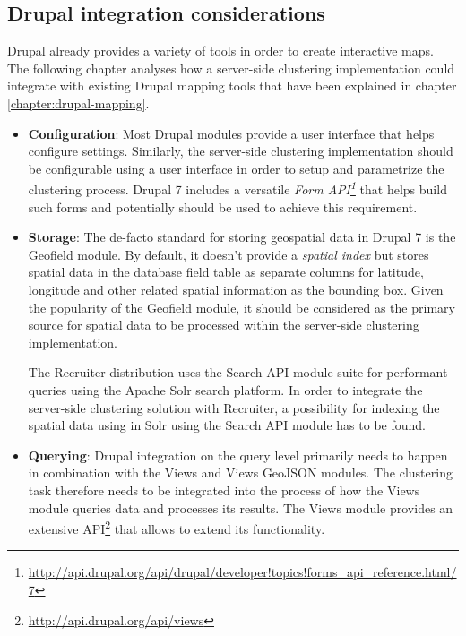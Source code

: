 \subsection{Drupal integration considerations}
\label{chapter:analysis-drupal}

Drupal already provides a variety of tools in order to create interactive maps. The following chapter analyses how a server-side clustering implementation could integrate with existing Drupal mapping tools that have been explained in chapter \ref{chapter:drupal-mapping}.

\begin{itemize}

\item \textbf{Configuration}: Most Drupal modules provide a user interface that helps configure settings. Similarly, the server-side clustering implementation should be configurable using a user interface in order to setup and parametrize the clustering process. Drupal 7 includes a versatile \textit{Form API\footnote{\url{http://api.drupal.org/api/drupal/developer!topics!forms_api_reference.html/7}}} that helps build such forms and potentially should be used to achieve this requirement.

\item \textbf{Storage}: The de-facto standard for storing geospatial data in Drupal 7 is the Geofield module. By default, it doesn't provide a \textit{spatial index} but stores spatial data in the database field table as separate columns for latitude, longitude and other related spatial information as the bounding box. Given the popularity of the Geofield module, it should be considered as the primary source for spatial data to be processed within the server-side clustering implementation.

The Recruiter distribution uses the Search API module suite for performant queries using the Apache Solr search platform. In order to integrate the server-side clustering solution with Recruiter, a possibility for indexing the spatial data using in Solr using the Search API module has to be found.

\item \textbf{Querying}: Drupal integration on the query level primarily needs to happen in combination with the Views and Views GeoJSON modules. The clustering task therefore needs to be integrated into the process of how the Views module queries data and processes its results. The Views module provides an extensive API\footnote{\url{http://api.drupal.org/api/views}} that allows to extend its functionality.


\end{itemize}
